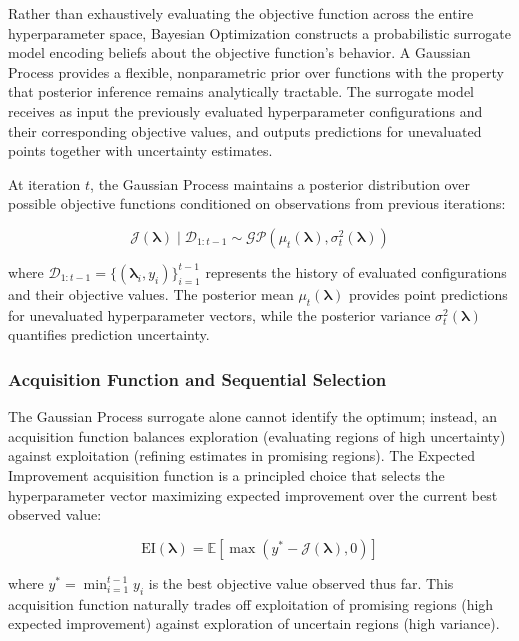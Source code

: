 \documentclass[conference]{IEEEtran}
\begin{document}
Rather than exhaustively evaluating the objective function across the entire hyperparameter space, Bayesian Optimization constructs a probabilistic surrogate model encoding beliefs about the objective function's behavior. A Gaussian Process provides a flexible, nonparametric prior over functions with the property that posterior inference remains analytically tractable. The surrogate model receives as input the previously evaluated hyperparameter configurations and their corresponding objective values, and outputs predictions for unevaluated points together with uncertainty estimates.

At iteration $t$, the Gaussian Process maintains a posterior distribution over possible objective functions conditioned on observations from previous iterations:

\begin{equation}
    \mathcal{J}(\boldsymbol{\lambda}) \mid \mathcal{D}_{1:t-1} \sim \mathcal{GP}(\mu_t(\boldsymbol{\lambda}), \sigma_t^2(\boldsymbol{\lambda}))
\end{equation}

where $\mathcal{D}_{1:t-1} = \{(\boldsymbol{\lambda}_i, y_i)\}_{i=1}^{t-1}$ represents the history of evaluated configurations and their objective values. The posterior mean $\mu_t(\boldsymbol{\lambda})$ provides point predictions for unevaluated hyperparameter vectors, while the posterior variance $\sigma_t^2(\boldsymbol{\lambda})$ quantifies prediction uncertainty.

\subsubsection{Acquisition Function and Sequential Selection}

The Gaussian Process surrogate alone cannot identify the optimum; instead, an acquisition function balances exploration (evaluating regions of high uncertainty) against exploitation (refining estimates in promising regions). The Expected Improvement acquisition function is a principled choice that selects the hyperparameter vector maximizing expected improvement over the current best observed value:

\begin{equation}
    \text{EI}(\boldsymbol{\lambda}) = \mathbb{E}\left[\max(y^* - \mathcal{J}(\boldsymbol{\lambda}), 0)\right]
\end{equation}

where $y^* = \min_{i=1}^{t-1} y_i$ is the best objective value observed thus far. This acquisition function naturally trades off exploitation of promising regions (high expected improvement) against exploration of uncertain regions (high variance).
\end{document}
